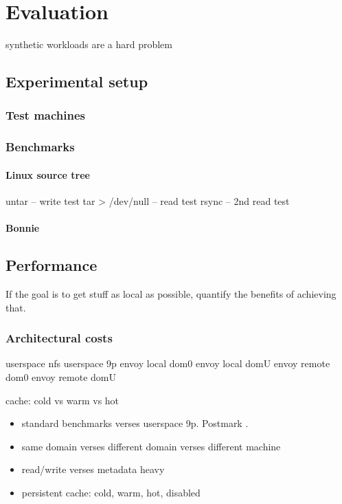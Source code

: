 \chapter{Evaluation}\label{cha:evaluation}

synthetic workloads are a hard problem \cite{ganger95}

\section{Experimental setup}

\subsection{Test machines}

\subsection{Benchmarks}

\subsubsection{Linux source tree}
untar -- write test
tar > /dev/null -- read test
rsync -- 2nd read test

\subsubsection{Bonnie}

\section{Performance}

If the goal is to get stuff as local as possible, quantify the benefits of achieving that.

\subsection{Architectural costs}

userspace nfs
userspace 9p
envoy local dom0
envoy local domU
envoy remote dom0
envoy remote domU

cache: cold vs warm vs hot

\begin{itemize}
\item standard benchmarks verses userspace 9p. Postmark \cite{katcher}.
\item same domain verses different domain verses different machine
\item read/write verses metadata heavy
\item persistent cache: cold, warm, hot, disabled
\end{itemize}

